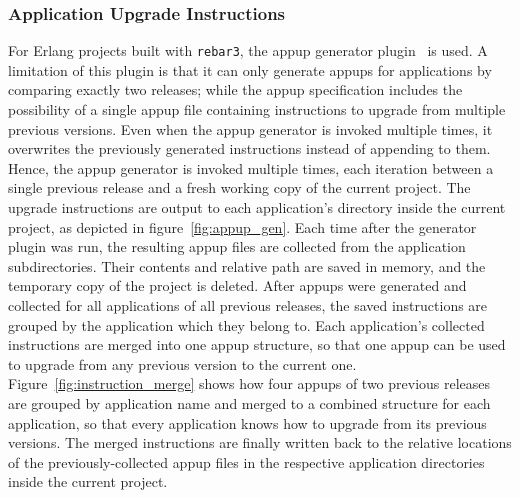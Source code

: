 {\subsubsection{Application Upgrade Instructions} For Erlang projects built with \lstinline|rebar3|, the \acrlong{appup} generator plugin~\cite{rebar3appup} is used. A limitation of this plugin is that it can only generate \acrshort{appup}s for applications by comparing exactly two releases; while the \acrshort{appup} specification includes the possibility of a single \acrshort{appup} file containing instructions to upgrade from multiple previous versions. Even when the \acrshort{appup} generator is invoked multiple times, it overwrites the previously generated instructions instead of appending to them. Hence, the \acrshort{appup} generator is invoked multiple times, each iteration between a single previous release and a fresh working copy of the current project. The upgrade instructions are output to each application's directory inside the current project, as depicted in figure~\ref{fig:appup_gen}. Each time after the generator plugin was run, the resulting \acrshort{appup} files are collected from the application subdirectories. Their contents and relative path are saved in memory, and the temporary copy of the project is deleted. After \acrshort{appup}s were generated and collected for all applications of all previous releases, the saved instructions are grouped by the application which they belong to. Each application's collected instructions are merged into one \acrshort{appup} structure, so that one \acrshort{appup} can be used to upgrade from any previous version to the current one. Figure~\ref{fig:instruction_merge} shows how four \acrshort{appup}s of two previous releases are grouped by application name and merged to a combined structure for each application, so that every application knows how to upgrade from its previous versions. The merged instructions are finally written back to the relative locations of the previously-collected \acrshort{appup} files in the respective application directories inside the current project.

\cleardoublepage

}
